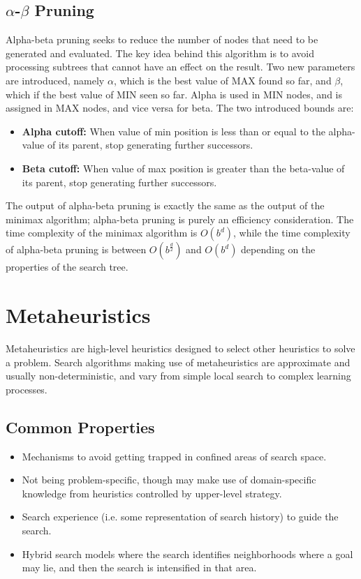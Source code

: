 \documentclass[12pt,titlepage]{article}
\begin{document}
    \subsection{$\alpha$-$\beta$ Pruning}
      Alpha-beta pruning seeks to reduce the number of nodes that need to be generated and evaluated. The key idea behind this algorithm is to avoid
      processing subtrees that cannot have an effect on the result. Two new parameters are introduced, namely $\alpha$, which is the best value of MAX
      found so far, and $\beta$, which if the best value of MIN seen so far. Alpha is used in MIN nodes, and is assigned in MAX nodes, and vice versa for
      beta. The two introduced bounds are:
      \begin{itemize}
        \item \textbf{Alpha cutoff:} When value of min position is less than or equal to the alpha-value of its parent, stop generating further successors.
        \item \textbf{Beta cutoff:} When value of max position is greater than the beta-value of its parent, stop generating further successors.
      \end{itemize}

      The output of alpha-beta pruning is exactly the same as the output of the minimax algorithm; alpha-beta pruning is purely an efficiency consideration.
      The time complexity of the minimax algorithm is $O(b^d)$, while the time complexity of alpha-beta pruning is between $O(b^\frac{d}{2})$ and $O(b^d)$
      depending on the properties of the search tree.

  \section{Metaheuristics}
    Metaheuristics are high-level heuristics designed to select other heuristics to solve a problem. Search algorithms making use of metaheuristics are approximate
    and usually non-deterministic, and vary from simple local search to complex learning processes.

    \subsection{Common Properties}
      \begin{itemize}
        \item Mechanisms to avoid getting trapped in confined areas of search space.
        \item Not being problem-specific, though may make use of domain-specific knowledge from heuristics controlled by upper-level strategy.
        \item Search experience (i.e. some representation of search history) to guide the search.
        \item Hybrid search models where the search identifies neighborhoods where a goal may lie, and then the search is intensified in that area.
      \end{itemize}
\end{document}
